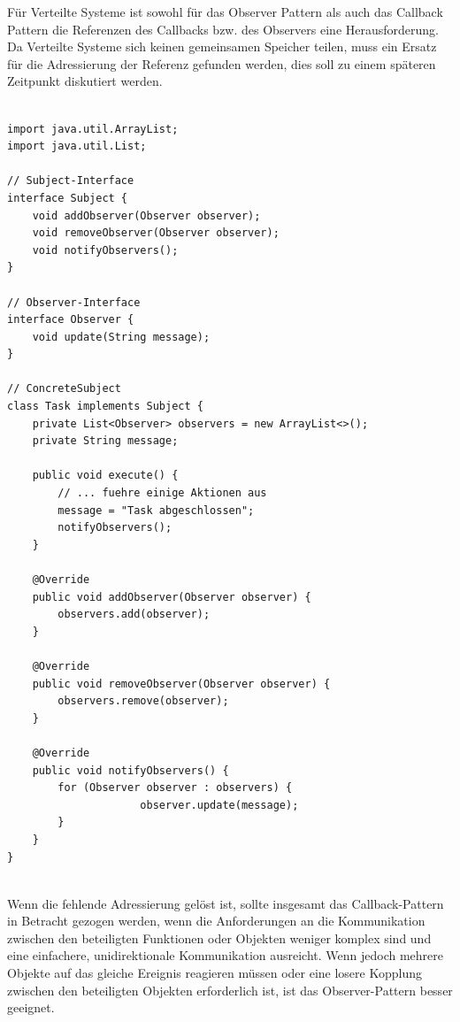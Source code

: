 Für Verteilte Systeme ist sowohl für das Observer Pattern als auch das Callback Pattern die Referenzen des Callbacks bzw. des Observers eine Herausforderung. Da Verteilte Systeme sich keinen gemeinsamen Speicher teilen, muss ein Ersatz für die Adressierung der Referenz gefunden werden, dies soll zu einem späteren Zeitpunkt diskutiert werden. \\\\
\begin{minipage}{\textwidth}
\begin{lstlisting}[caption={Observer Pattern - ConcreteSubject},captionpos=b,label={lst:observer-I}]
import java.util.ArrayList;
import java.util.List;

// Subject-Interface
interface Subject {
    void addObserver(Observer observer);
    void removeObserver(Observer observer);
    void notifyObservers();
}

// Observer-Interface
interface Observer {
    void update(String message);
}

// ConcreteSubject
class Task implements Subject {
    private List<Observer> observers = new ArrayList<>();
    private String message;

    public void execute() {
        // ... fuehre einige Aktionen aus
        message = "Task abgeschlossen";
        notifyObservers();
    }

    @Override
    public void addObserver(Observer observer) {
        observers.add(observer);
    }

    @Override
    public void removeObserver(Observer observer) {
        observers.remove(observer);
    }

    @Override
    public void notifyObservers() {
        for (Observer observer : observers) {
                     observer.update(message);
        }
    }
}


\end{lstlisting}
\end{minipage}


Wenn die fehlende Adressierung gelöst ist, sollte insgesamt das Callback-Pattern in Betracht gezogen werden, wenn die Anforderungen an die Kommunikation zwischen den beteiligten Funktionen oder Objekten weniger komplex sind und eine einfachere, unidirektionale Kommunikation ausreicht. Wenn jedoch mehrere Objekte auf das gleiche Ereignis reagieren müssen oder eine losere Kopplung zwischen den beteiligten Objekten erforderlich ist, ist das Observer-Pattern besser geeignet.

